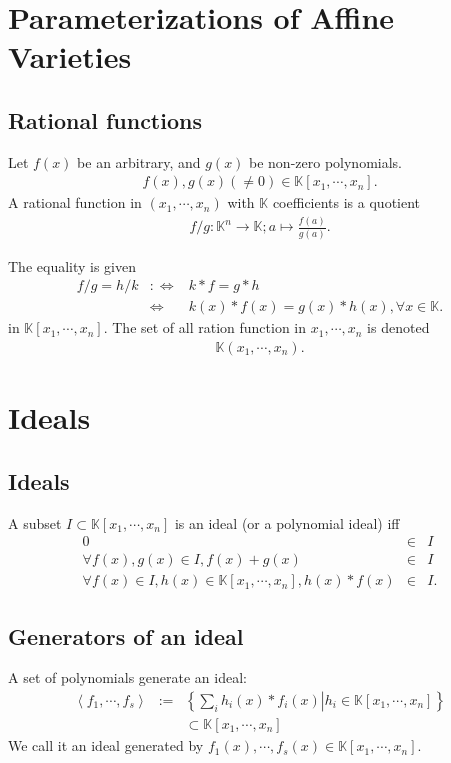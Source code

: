 \documentclass[11pt]{book}
\begin{document}
\section{Parameterizations of Affine Varieties}
\subsection{Rational functions}
Let $f(x)$ be an arbitrary, and $g(x)$ be non-zero polynomials.
\begin{eqnarray}
f(x),g(x) (\neq 0) \in \mathbb{K}[x_1,\cdots,x_n].
\end{eqnarray}
A rational function in $(x_1,\cdots,x_n)$ with $\mathbb{K}$ coefficients is a quotient
\begin{eqnarray}
f/g : \mathbb{K}^n \to \mathbb{K}; a \mapsto \frac{f(a)}{g(a)}.
\end{eqnarray}

The equality is given
\begin{eqnarray}
f/g = h/k &:\Leftrightarrow& k*f = g*h \\
&\Leftrightarrow& k(x)*f(x) = g(x)*h(x), \forall x \in \mathbb{K}.
\end{eqnarray}
in $\mathbb{K}[x_1, \cdots, x_n]$.
The set of all ration function in $x_1, \cdots, x_n$ is denoted
\begin{eqnarray}
\mathbb{K}(x_1, \cdots, x_n).
\end{eqnarray}

\section{Ideals}
\subsection{Ideals}
\label{DefOfIdeal}
A subset $I \subset \mathbb{K}[x_1,\cdots,x_n]$ is an ideal (or a polynomial ideal) iff
\begin{eqnarray}
0 &\in& I \\
\forall f(x),g(x) \in I, f(x) + g(x) &\in& I \\
\forall f(x) \in I, h(x) \in \mathbb{K}[x_1,\cdots,x_n], h(x)*f(x) &\in& I.
\end{eqnarray}

\subsection{Generators of an ideal}
A set of polynomials generate an ideal:
\begin{eqnarray}
\left< f_1, \cdots, f_s \right> &:=& \left\{ \left. \sum_i h_i(x) * f_i(x) \right| h_i \in \mathbb{K}[x_1,\cdots,x_n] \right\} \\
&&\subset \mathbb{K}[x_1,\cdots,x_n]
\end{eqnarray}
We call it an ideal generated by $f_1(x), \cdots, f_s(x) \in \mathbb{K}[x_1,\cdots,x_n]$.
\end{document}

